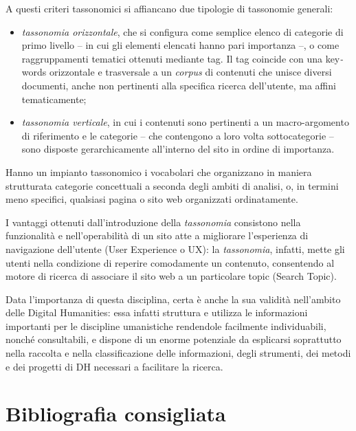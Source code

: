 \documentclass[
  b5paper,
  twoside,
  11pt,
  chapterprefix=false,
  bibliography=totocnumbered,
  parskip=0]{scrbook}
\begin{document}
A questi criteri tassonomici si affiancano due tipologie di tassonomie
generali:

\begin{itemize}
\item
  \emph{tassonomia orizzontale}, che si configura come semplice elenco di
  categorie di primo livello -- in cui gli elementi elencati hanno
  pari importanza --, o come raggruppamenti tematici ottenuti mediante
  tag. Il tag coincide con una key\emph{-}words orizzontale e trasversale a
  un \emph{corpus} di contenuti che unisce diversi documenti, anche non
  pertinenti alla specifica ricerca dell'utente, ma affini
  tematicamente;
\item
  \emph{tassonomia verticale}, in cui i contenuti sono pertinenti a un
  macro-argomento di riferimento e le categorie -- che contengono a
  loro volta sottocategorie -- sono disposte gerarchicamente
  all'interno del sito in ordine di importanza.
\end{itemize}

Hanno un impianto tassonomico i vocabolari che organizzano in maniera
strutturata categorie concettuali a seconda degli ambiti di analisi, o,
in termini meno specifici, qualsiasi pagina o sito web organizzati
ordinatamente.

I vantaggi ottenuti dall'introduzione della \emph{tassonomia} consistono
nella funzionalità e nell'operabilità di un sito atte a migliorare
l'esperienza di navigazione dell'utente (User Experience o UX): la
\emph{tassonomia}, infatti, mette gli utenti nella condizione di reperire
comodamente un contenuto, consentendo al motore di ricerca di associare
il sito web a un particolare topic (Search Topic).

Data l'importanza di questa disciplina, certa è anche la sua validità
nell'ambito delle Digital Humanities: essa infatti struttura e utilizza
le informazioni importanti per le discipline umanistiche rendendole
facilmente individuabili, nonché consultabili, e dispone di un enorme
potenziale da esplicarsi soprattutto nella raccolta e nella
classificazione delle informazioni, degli strumenti, dei metodi e dei
progetti di DH necessari a facilitare la ricerca.

\hypertarget{bibliografia-consigliata-24}{%
\section*{Bibliografia consigliata}\label{bibliografia-consigliata-24}}
\end{document}
